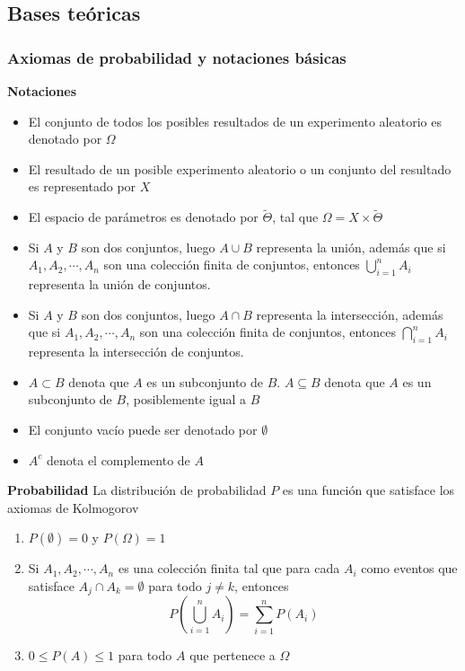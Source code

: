 \subsection{Bases teóricas}
\subsubsection{Axiomas de probabilidad y notaciones básicas}

\begin{defi}
    \textbf{Notaciones} \parencite{koski2011bayesian}
    \begin{itemize}
        \item El conjunto de todos los posibles resultados de un experimento aleatorio es denotado por $\Omega$
        \item El resultado de un posible experimento aleatorio o un conjunto del resultado es representado por $X$
        \item El espacio de parámetros es denotado por $\tilde{\Theta}$, tal que $\Omega = X \times \tilde{\Theta}$
        \item Si $A$ y $B$ son dos conjuntos, luego $A \cup B$ representa la unión, además que si ${A}_{1},{A}_{2},\cdots,{A}_{n}$ son una colección finita de conjuntos, entonces $\bigcup_{i=1}^{n} {A}_{i}$ representa la unión de conjuntos.
        \item Si $A$ y $B$ son dos conjuntos, luego $A \cap B$ representa la intersección, además que si ${A}_{1},{A}_{2},\cdots,{A}_{n}$ son una colección finita de conjuntos, entonces $\bigcap_{i=1}^{n} {A}_{i}$ representa la intersección de conjuntos.
        \item $A \subset B$ denota que $A$ es un subconjunto de $B$. $A \subseteq B$ denota que $A$ es un subconjunto de $B$, posiblemente igual a $B$
        \item El conjunto vacío puede ser denotado por $\emptyset$
        \item ${A}^{c}$ denota el complemento de $A$ 
    \end{itemize}
\end{defi}

\begin{defi}
    \textbf{Probabilidad} \parencite{koski2011bayesian}
    La distribución de probabilidad $P$ es una función que satisface los axiomas de Kolmogorov
    \begin{enumerate}
        \item $P(\emptyset) = 0$ y $P(\Omega) = 1$
        \item Si ${A}_{1},{A}_{2},\cdots,{A}_{n}$ es una colección finita tal que para cada $A_i$ como eventos que satisface ${A}_{j} \cap {A}_{k} = \emptyset$ para todo $j \neq k$, entonces
        $$P(\bigcup_{i=1}^{n} {A}_{i})=\sum\limits_{i = 1}^{n}P(A_i)$$ 
        \item $0 \leq P(A) \leq 1$ para todo $A$ que pertenece a $\Omega$
    \end{enumerate}
\end{defi}

